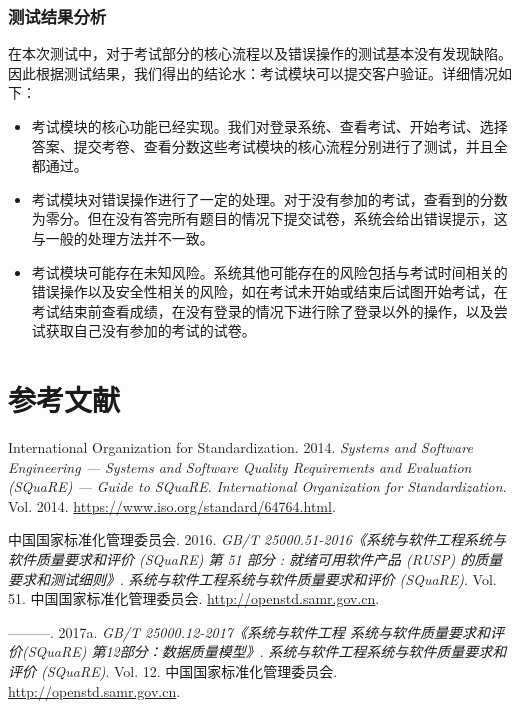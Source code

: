 \documentclass[hyperref, a4paper]{ctexart}
\begin{document}
\hypertarget{ux6d4bux8bd5ux7ed3ux679cux5206ux6790-2}{%
\subsubsection{测试结果分析}\label{ux6d4bux8bd5ux7ed3ux679cux5206ux6790-2}}

在本次测试中，对于考试部分的核心流程以及错误操作的测试基本没有发现缺陷。因此根据测试结果，我们得出的结论水：考试模块可以提交客户验证。详细情况如下：

\begin{itemize}
\item
  考试模块的核心功能已经实现。我们对登录系统、查看考试、开始考试、选择答案、提交考卷、查看分数这些考试模块的核心流程分别进行了测试，并且全都通过。
\item
  考试模块对错误操作进行了一定的处理。对于没有参加的考试，查看到的分数为零分。但在没有答完所有题目的情况下提交试卷，系统会给出错误提示，这与一般的处理方法并不一致。
\item
  考试模块可能存在未知风险。系统其他可能存在的风险包括与考试时间相关的错误操作以及安全性相关的风险，如在考试未开始或结束后试图开始考试，在考试结束前查看成绩，在没有登录的情况下进行除了登录以外的操作，以及尝试获取自己没有参加的考试的试卷。
\end{itemize}

\pagebreak

\hypertarget{ux53c2ux8003ux6587ux732e}{%
\section*{参考文献}\label{ux53c2ux8003ux6587ux732e}}

\hypertarget{refs}{}
\leavevmode\hypertarget{ref-innovativeInternationalisation}{}%
International Organization for Standardization. 2014. \emph{Systems and
Software Engineering --- Systems and Software Quality Requirements and
Evaluation (SQuaRE) --- Guide to SQuaRE}. \emph{International
Organization for Standardization}. Vol. 2014.
\url{https://www.iso.org/standard/64764.html}.

\leavevmode\hypertarget{ref-innovative1}{}%
中国国家标准化管理委员会. 2016. \emph{GB/T
25000.51-2016《系统与软件工程系统与软件质量要求和评价 (SQuaRE) 第 51
部分 : 就绪可用软件产品 (RUSP) 的质量要求和测试细则》}.
\emph{系统与软件工程系统与软件质量要求和评价 (SQuaRE)}. Vol. 51.
中国国家标准化管理委员会. \url{http://openstd.samr.gov.cn}.

\leavevmode\hypertarget{ref-innovative3}{}%
---------. 2017a. \emph{GB/T 25000.12-2017《系统与软件工程
系统与软件质量要求和评价(SQuaRE) 第12部分：数据质量模型》}.
\emph{系统与软件工程系统与软件质量要求和评价 (SQuaRE)}. Vol. 12.
中国国家标准化管理委员会. \url{http://openstd.samr.gov.cn}.
\end{document}
